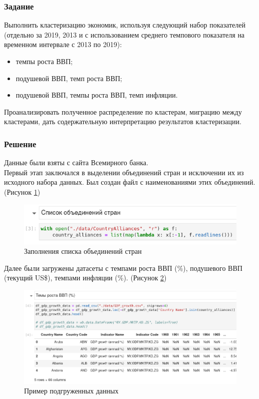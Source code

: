 \documentclass[14pt,fleqn]{extarticle}
\begin{document}
    \subsubsection*{Задание}
    
    Выполнить кластеризацию экономик, используя следующий набор показателей (отдельно за 2019, 2013 и с использованием среднего темпового показателя на временном интервале с 2013 по 2019):
    \begin{itemize}[topsep=0pt,itemsep=-1ex,partopsep=1ex,parsep=1ex]
		\item темпы роста ВВП;
		\item подушевой ВВП, темп роста ВВП;
		\item подушевой ВВП, темпы роста ВВП, темп инфляции.
	\end{itemize}

	Проанализировать полученное распределение по кластерам, миграцию между кластерами, дать содержательную интерпретацию результатов кластеризации.
	
	\subsubsection*{Решение}
	
	Данные были взяты с сайта Всемирного банка.\\
	Первый этап заключался в выделении объединений стран и исключении их из исходного набора данных. Был создан файл с наименованиями этих объединений. (Рисунок \ref{fig:cluster_county_alliances})
	\begin{figure}[h]
		\centering \includegraphics[scale=0.6]{cluster_county_alliances}
		\caption{Заполнения списка объединений стран}
		\label{fig:cluster_county_alliances}
	\end{figure}

	Далее были загружены датасеты с темпами роста ВВП (\%), подушевого ВВП (текущий US\$), темпами инфляции (\%). (Рисунок \ref{fig:cluster_dataset_example})
	\begin{figure}[h]
		\centering \includegraphics[scale=0.45]{cluster_dataset_example}
		\caption{Пример подгруженных данных}
		\label{fig:cluster_dataset_example}
	\end{figure}
	
\end{document}
